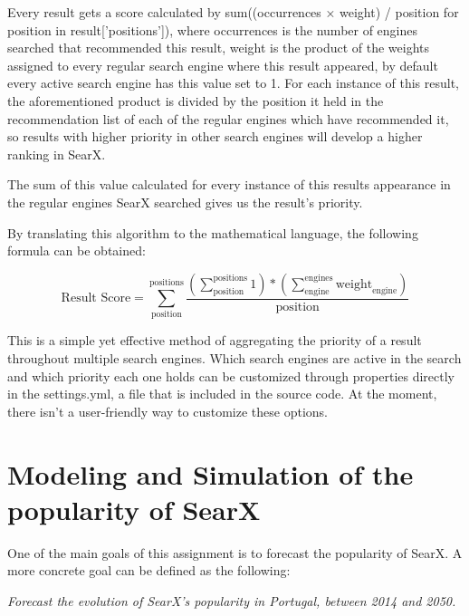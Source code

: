 \documentclass{article}
\begin{document}


Every result gets a score calculated by sum((occurrences × weight) / position for position in result['positions']), where occurrences is the number of engines searched that recommended this result, weight is the product of the weights assigned to every regular search engine where this result appeared, by default every active search engine has this value set to 1. For each instance of this result, the aforementioned product is divided by the position it held in the recommendation list of each of the regular engines which have recommended it, so results with higher priority in other search engines will develop a higher ranking in SearX.

The sum of this value calculated for every instance of this results appearance in the regular engines SearX searched gives us the result’s priority.

By translating this algorithm to the mathematical language, the following formula can be obtained:

\begin{equation} %
    \text{Result Score} = \sum_\text{position}^\text{positions} \frac{(\sum_\text{position}^\text{positions} 1) * (\sum_\text{engine}^\text{engines} \text{weight}_\text{engine})}{\text{position}} 
\end{equation}

This is a simple yet effective method of aggregating the priority of a result throughout multiple search engines. Which search engines are active in the search and which priority each one holds can be customized through properties directly in the settings.yml, a file that is included in the source code. At the moment, there isn’t a user-friendly way to customize these options.

\section{Modeling and Simulation of the popularity of SearX}

One of the main goals of this assignment is to forecast the popularity of SearX. A more concrete goal can be defined as the following:

\begin{center}
    \textit{Forecast the evolution of SearX’s popularity in Portugal, between 2014 and 2050.}
\end{center}
\end{document}
